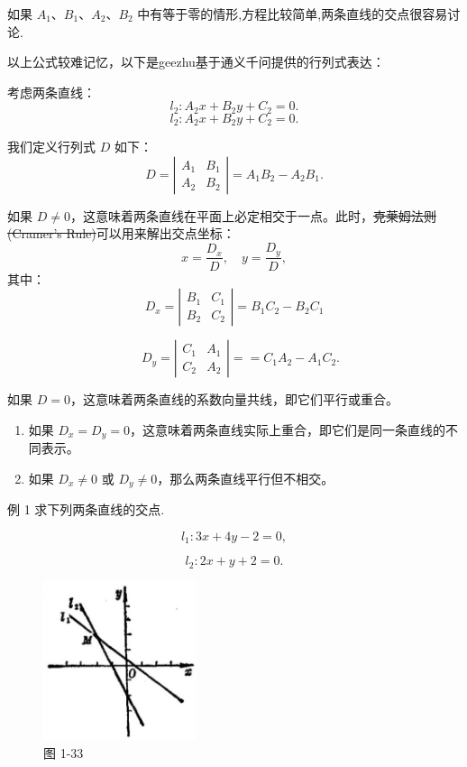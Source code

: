 \documentclass[lang=cn,newtx,10.5pt,scheme=chinese]{elegantbook}
\begin{document}
如果 \({A}_{1}\text{、}{B}_{1}\text{、}{A}_{2}\text{、}{B}_{2}\) 中有等于零的情形,方程比较简单,两条直线的交点很容易讨论.

以上公式较难记忆，以下是geezhu基于通义千问提供的行列式表达：

考虑两条直线：
\[
l_2: A_2x + B_2y + C_2 = 0.
\]
\[
l_2: A_2x + B_2y + C_2 = 0.
\]

我们定义行列式 \(D\) 如下：
\[
  D = \left| \begin{array}{cc}
               A_1 & B_1 \\
               A_2 & B_2
  \end{array} \right| = A_1B_2 - A_2B_1.
\]

如果 \(D \neq 0\)，这意味着两条直线在平面上必定相交于一点。此时，\sout{克莱姆法则(Cramer's Rule)}可以用来解出交点坐标：
\[
  x = \frac{D_x}{D}, \quad y = \frac{D_y}{D},
\]
其中：
\[
  D_x = \left| \begin{array}{cc}
                  B_1 & C_1 \\
                  B_2 & C_2
  \end{array} \right|=B_1C_2-B_2C_1\]

\[ \quad
D_y = \left| \begin{array}{cc}
               C_1 & A_1 \\
               C_2 & A_2
\end{array} \right| ==C_1A_2-A_1C_2.
\]

如果 \(D = 0\)，这意味着两条直线的系数向量共线，即它们平行或重合。

\begin{enumerate}
  \item 如果 \(D_x = D_y = 0\)，这意味着两条直线实际上重合，即它们是同一条直线的不同表示。
  \item 如果 \(D_x \neq 0\) 或 \(D_y \neq 0\)，那么两条直线平行但不相交。
\end{enumerate}

例 1 求下列两条直线的交点.

\[
    {l}_{1} : {3x} + {4y} - 2 = 0,
\]

\[
    {l}_{2} : {2x} + y + 2 = 0.
\]

\begin{figure}[h]
  \centering
  \includegraphics[max width=0.4\textwidth]{images/01912cc2-ffb6-728e-9ae7-b113ff05c64b_52_702387.jpg}
  \caption{图 1-33}
\end{figure}
\end{document}
